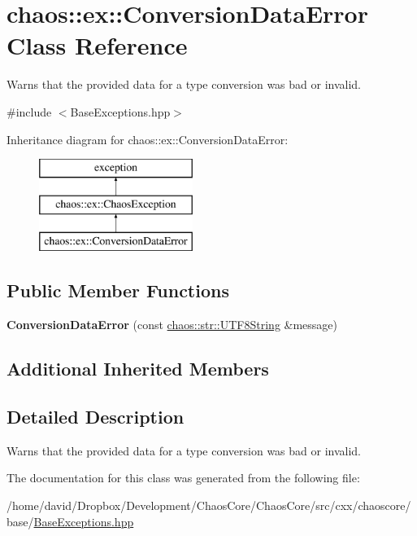 \hypertarget{classchaos_1_1ex_1_1_conversion_data_error}{\section{chaos\-:\-:ex\-:\-:Conversion\-Data\-Error Class Reference}
\label{classchaos_1_1ex_1_1_conversion_data_error}
}


Warns that the provided data for a type conversion was bad or invalid.  




{\ttfamily \#include $<$Base\-Exceptions.\-hpp$>$}

Inheritance diagram for chaos\-:\-:ex\-:\-:Conversion\-Data\-Error\-:\begin{figure}[H]
\begin{center}
\leavevmode
\includegraphics[height=3.000000cm]{classchaos_1_1ex_1_1_conversion_data_error}
\end{center}
\end{figure}
\subsection*{Public Member Functions}
\begin{DoxyCompactItemize}
\item 
\hypertarget{classchaos_1_1ex_1_1_conversion_data_error_afef7fd90707b2bd0be147090613c1222}{{\bfseries Conversion\-Data\-Error} (const \hyperlink{classchaos_1_1str_1_1_u_t_f8_string}{chaos\-::str\-::\-U\-T\-F8\-String} \&message)}\label{classchaos_1_1ex_1_1_conversion_data_error_afef7fd90707b2bd0be147090613c1222}

\end{DoxyCompactItemize}
\subsection*{Additional Inherited Members}


\subsection{Detailed Description}
Warns that the provided data for a type conversion was bad or invalid. 

The documentation for this class was generated from the following file\-:\begin{DoxyCompactItemize}
\item 
/home/david/\-Dropbox/\-Development/\-Chaos\-Core/\-Chaos\-Core/src/cxx/chaoscore/base/\hyperlink{_base_exceptions_8hpp}{Base\-Exceptions.\-hpp}\end{DoxyCompactItemize}
